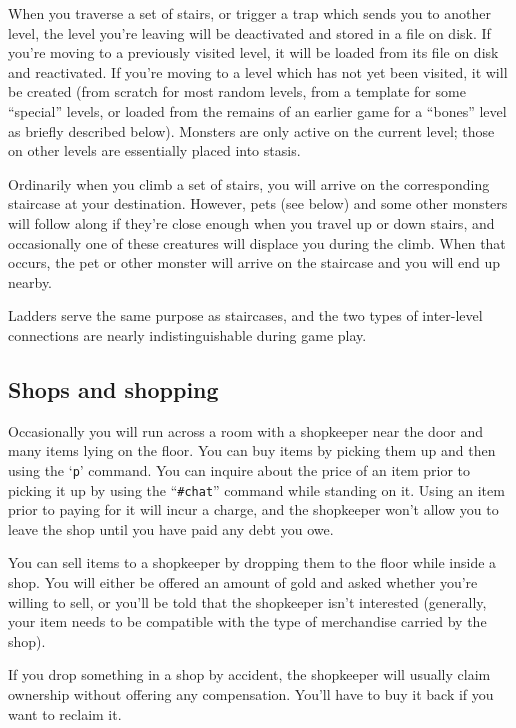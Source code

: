 \documentclass[titlepage]{article}
\begin{document}
When you traverse a set of stairs, or trigger a trap which sends you
to another level, the level you're leaving will be deactivated and
stored in a file on disk.  If you're moving to a previously visited
level, it will be loaded from its file on disk and reactivated.  If
you're moving to a level which has not yet been visited, it will be
created (from scratch for most random levels, from a template for
some ``special'' levels, or loaded from the remains of an earlier game
for a ``bones'' level as briefly described below).  Monsters are only
active on the current level; those on other levels are essentially
placed into stasis.

Ordinarily when you climb a set of stairs, you will arrive on the
corresponding staircase at your destination.  However, pets (see below)
and some other monsters will follow along if they're close enough when
you travel up or down stairs, and occasionally one of these creatures
will displace you during the climb.  When that occurs, the pet or other
monster will arrive on the staircase and you will end up nearby.

Ladders serve the same purpose as staircases, and the two types of
inter-level connections are nearly indistinguishable during game play.

\subsection*{Shops and shopping}

Occasionally you will run across a room with a shopkeeper near the door
and many items lying on the floor.  You can buy items by picking them
up and then using the `\texttt{p}' command.  You can inquire about the price
of an item prior to picking it up by using the ``\texttt{\#chat}'' command
while standing on it.  Using an item prior to paying for it will incur a
charge, and the shopkeeper won't allow you to leave the shop until you
have paid any debt you owe.

You can sell items to a shopkeeper by dropping them to the floor while
inside a shop.  You will either be offered an amount of gold and asked
whether you're willing to sell, or you'll be told that the shopkeeper
isn't interested (generally, your item needs to be compatible with the
type of merchandise carried by the shop).

If you drop something in a shop by accident, the shopkeeper will usually
claim ownership without offering any compensation.  You'll have to buy
it back if you want to reclaim it.
\end{document}
